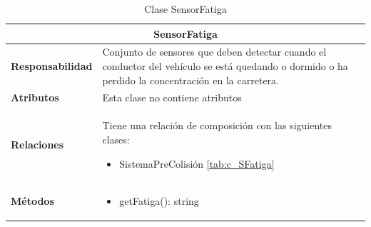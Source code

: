 \begin{table}[H]
\begin{center}
\begin{tabular}{p{} p{11cm}}
\multicolumn{2}{c}{\textbf{SensorFatiga} } \\ \hline \hline
\textbf{Responsabilidad} &  Conjunto de sensores que deben detectar cuando el conductor del vehículo se está quedando o dormido o ha perdido la concentración en la carretera.  \\ \hline
\textbf{Atributos} & Esta clase no contiene atributos\\ \hline
\textbf{Relaciones} & \par Tiene una relación de composición con las siguientes clases:
                      \begin{itemize}
                        \item SistemaPreColisión \ref{tab:c_SFatiga}
                      \end{itemize}

                      \\ \hline

\textbf{Métodos} &  \begin{itemize}
                      \item getFatiga(): string
                    \end{itemize}\\ \hline
\end{tabular}
\caption{Clase SensorFatiga}
\label{tab:c_SensorF}
\end{center}
\end{table}









